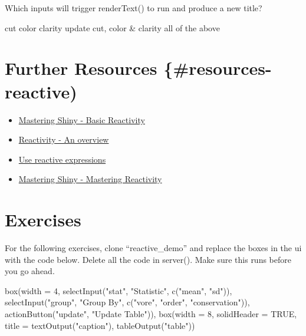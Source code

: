 \documentclass[
]{book}
\newenvironment{Shaded}{\begin{snugshade}}{\end{snugshade}}
\newcommand{\AttributeTok}[1]{\textcolor[rgb]{0.77,0.63,0.00}{#1}}
\newcommand{\ConstantTok}[1]{\textcolor[rgb]{0.00,0.00,0.00}{#1}}
\newcommand{\DecValTok}[1]{\textcolor[rgb]{0.00,0.00,0.81}{#1}}
\newcommand{\FunctionTok}[1]{\textcolor[rgb]{0.00,0.00,0.00}{#1}}
\newcommand{\NormalTok}[1]{#1}
\newcommand{\StringTok}[1]{\textcolor[rgb]{0.31,0.60,0.02}{#1}}
\providecommand{\tightlist}{%
  \setlength{\itemsep}{0pt}\setlength{\parskip}{0pt}}
\begin{document}
Which inputs will trigger renderText() to run and produce a new title?

cut color clarity update cut, color \& clarity all of the above

\hypertarget{further-resources-resources-reactive}{%
\section{Further Resources \{\#resources-reactive)}\label{further-resources-resources-reactive}}

\begin{itemize}
\tightlist
\item
  \href{https://mastering-shiny.org/basic-reactivity.html}{Mastering Shiny - Basic Reactivity}
\item
  \href{https://shiny.rstudio.com/articles/reactivity-overview.html}{Reactivity - An overview}
\item
  \href{https://shiny.rstudio.com/tutorial/written-tutorial/lesson6/}{Use reactive expressions}
\item
  \href{https://mastering-shiny.org/reactivity-intro.html}{Mastering Shiny - Mastering Reactivity}
\end{itemize}

\hypertarget{exercises-reactive}{%
\section{Exercises}\label{exercises-reactive}}

For the following exercises, clone ``reactive\_demo'' and replace the boxes in the ui with the code below. Delete all the code in server(). Make sure this runs before you go ahead.

\begin{Shaded}
\begin{Highlighting}[]
\FunctionTok{box}\NormalTok{(}\AttributeTok{width =} \DecValTok{4}\NormalTok{,}
    \FunctionTok{selectInput}\NormalTok{(}\StringTok{"stat"}\NormalTok{, }\StringTok{"Statistic"}\NormalTok{, }\FunctionTok{c}\NormalTok{(}\StringTok{"mean"}\NormalTok{, }\StringTok{"sd"}\NormalTok{)),}
    \FunctionTok{selectInput}\NormalTok{(}\StringTok{"group"}\NormalTok{, }\StringTok{"Group By"}\NormalTok{, }\FunctionTok{c}\NormalTok{(}\StringTok{"vore"}\NormalTok{, }\StringTok{"order"}\NormalTok{, }\StringTok{"conservation"}\NormalTok{)),}
    \FunctionTok{actionButton}\NormalTok{(}\StringTok{"update"}\NormalTok{, }\StringTok{"Update Table"}\NormalTok{)),}
\FunctionTok{box}\NormalTok{(}\AttributeTok{width =} \DecValTok{8}\NormalTok{,}
    \AttributeTok{solidHeader =} \ConstantTok{TRUE}\NormalTok{,}
    \AttributeTok{title =} \FunctionTok{textOutput}\NormalTok{(}\StringTok{"caption"}\NormalTok{),}
    \FunctionTok{tableOutput}\NormalTok{(}\StringTok{"table"}\NormalTok{))}
\end{Highlighting}
\end{Shaded}
\end{document}
